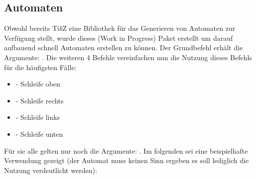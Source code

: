 \subsection{Automaten }
{\centering {}\vspace*{0.5\baselineskip}\par}
Obwohl bereits Ti\textit{k}Z eine Bibliothek für das Generieren von Automaten zur Verfügung stellt, wurde dieses (Work in Progress) Paket erstellt um darauf aufbauend schnell Automaten erstellen zu können. Der Grundbefehl  erhält die Argumente: . Die weiteren 4 Befehle vereinfachen nun die Nutzung dieses Befehls für die häufigsten Fälle:\marginpar{}\marginpar{\vspace*{-.25\baselineskip}}%
\begin{itemize}[label=$\diamond$]\narrowitems
    \item {} - Schleife oben
    \item {} - Schleife rechts
    \item {} - Schleife links
    \item {} - Schleife unten
\end{itemize}
Für sie alle gelten nur noch die Argumente: .
Im folgenden sei eine beispielhafte Verwendung gezeigt (der Automat muss keinen Sinn ergeben es soll lediglich die Nutzung verdeutlicht werden):

